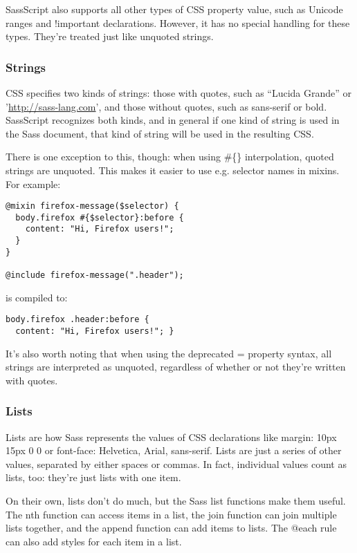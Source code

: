 \documentclass[9pt]{article}
\begin{document}
 SassScript also supports all other types of CSS property value, such as Unicode ranges and !important declarations. However, it has no special handling for these types. They’re treated just like unquoted strings.
\subsubsection{Strings}


 CSS specifies two kinds of strings: those with quotes, such as ``Lucida Grande'' or '\url{http://sass-lang.com}', and those without quotes, such as sans-serif or bold. SassScript recognizes both kinds, and in general if one kind of string is used in the Sass document, that kind of string will be used in the resulting CSS.


 There is one exception to this, though: when using \#\{\} interpolation, quoted strings are unquoted. This makes it easier to use e.g. selector names in mixins. For example:
\begin{verbatim}
@mixin firefox-message($selector) {
  body.firefox #{$selector}:before {
    content: "Hi, Firefox users!";
  }
}

@include firefox-message(".header");
\end{verbatim}


 is compiled to:
\begin{verbatim}
body.firefox .header:before {
  content: "Hi, Firefox users!"; }
\end{verbatim}


 It’s also worth noting that when using the deprecated = property syntax, all strings are interpreted as unquoted, regardless of whether or not they’re written with quotes.
\subsubsection{Lists}


 Lists are how Sass represents the values of CSS declarations like margin: 10px 15px 0 0 or font-face: Helvetica, Arial, sans-serif. Lists are just a series of other values, separated by either spaces or commas. In fact, individual values count as lists, too: they’re just lists with one item.


 On their own, lists don’t do much, but the Sass list functions make them useful. The nth function can access items in a list, the join function can join multiple lists together, and the append function can add items to lists. The @each rule can also add styles for each item in a list.
\end{document}
